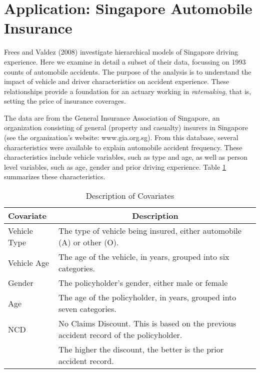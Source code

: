 \section{Application: Singapore Automobile Insurance}{\label{S12:SingaporeData}

Frees and Valdez (2008) investigate hierarchical models of Singapore
driving experience. Here we examine in detail a subset of their
data, focussing on 1993 counts of automobile accidents. The purpose
of the analysis is to understand the impact of vehicle and driver
characteristics on accident experience. These relationships provide
a foundation for an actuary working in \emph{ratemaking}, that is,
setting the price of insurance coverages.


The data are from the General Insurance Association of Singapore, an
organization consisting of general (property and casualty) insurers
in Singapore (see the organization's website: www.gia.org.sg). From
this database, several characteristics were available to explain
automobile accident frequency. These characteristics include vehicle
variables, such as type and age, as well as person level variables,
such as age, gender and prior driving experience. Table
\ref{T12:Table122} summarizes these characteristics.

  \begin{center}  \begin{table}[h]
\caption{\label{T12:Table122} Description of Covariates}
\begin{tabular}{lp{4in}}
\hline \textbf{Covariate} & \multicolumn{1}{c}{\textbf{Description}}
\\ \hline Vehicle Type & \multicolumn{1}{|p{4in}}{The type of
vehicle being insured,
either automobile (A) or other (O).} \\
Vehicle Age & \multicolumn{1}{|p{4in}}{The age of the vehicle, in years,
grouped into six categories.} \\
Gender & \multicolumn{1}{|p{4in}}{The policyholder's gender, either male or
female} \\
Age & \multicolumn{1}{|p{4in}}{The age of the policyholder, in years,
grouped into seven categories.} \\
NCD & \multicolumn{1}{|p{4in}}{No Claims Discount. This is based on the
previous accident record of the policyholder.} \\
& \multicolumn{1}{|p{4in}}{The higher the discount, the better is the prior
accident record.} \\ \hline
\end{tabular}
\end{table}  \end{center}  


}
